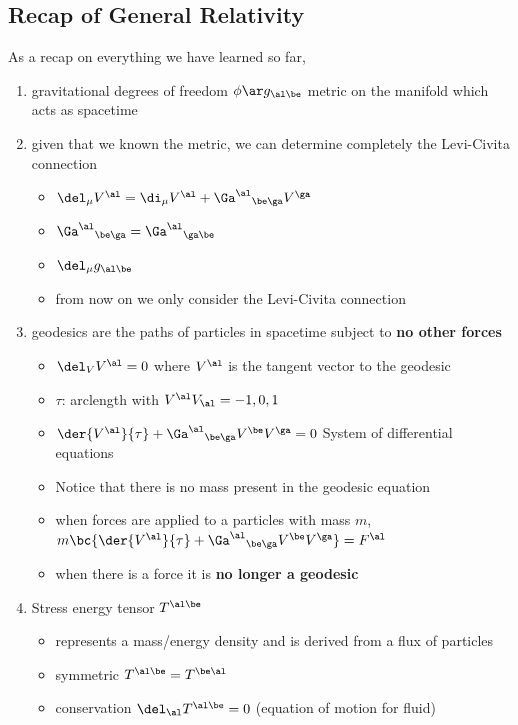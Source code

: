 \documentclass{article}
\begin{document}
\subsection{Recap of General Relativity}
As a recap on everything we have learned so far,
\begin{enumerate}
    \item gravitational degrees of freedom $\phi \ar g_{\al\be}$ metric on the manifold which acts as spacetime
    \item given that we known the metric, we can determine completely the Levi-Civita connection
    \begin{itemize}
        \item $\del_\mu V^\al = \di_\mu V^\al + {\Ga^\al}_{\be\ga}V^\ga$
        \item ${\Ga^\al}_{\be\ga} = {\Ga^\al}_{\ga\be}$
        \item $\del_\mu g_{\al\be}$
        \item from now on we only consider the Levi-Civita connection
    \end{itemize}
    \item geodesics are the paths of particles in spacetime subject to \textbf{no other forces}
    \begin{itemize}
        \item $\del_V V^\al = 0$ where $V^\al$ is the tangent vector to the geodesic
        \item $\tau$: arclength with $V^\al V_\al = -1, 0, 1$
        \item $\der{V^\al}{\tau} + {\Ga^\al}_{\be\ga} V^\be V^\ga = 0$ System of differential equations
        \item Notice that there is no mass present in the geodesic equation
        \item when forces are applied to a particles with mass $m$, $m\bc{\der{V^\al}{\tau} + {\Ga^\al}_{\be\ga} V^\be V^\ga} = F^\al$
        \item when there is a force it is \textbf{no longer a geodesic}
    \end{itemize}
    \item Stress energy tensor $T^{\al\be}$
    \begin{itemize}
        \item represents a mass/energy density and is derived from a flux of particles
        \item symmetric $T^{\al\be} = T^{\be\al}$
        \item conservation $\del_\al T^{\al\be} = 0$ (equation of motion for fluid)

\end{itemize}
\end{enumerate}
\end{document}

